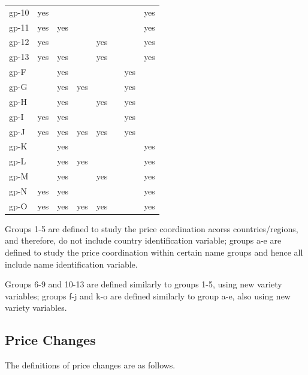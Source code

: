 \begin{table}[H]
\begin{tabular}{l|rrrrrrr}
		gp-10 &  yes &      &         &      &         &          &      yes \\
		gp-11 &  yes &  yes &         &      &         &          &      yes \\
		gp-12 &  yes &      &         &  yes &         &          &      yes \\
		gp-13 &  yes &  yes &         &  yes &         &          &      yes \\ \hline\hline
		gp-F  &      &  yes &         &      &         &      yes &          \\
		gp-G  &      &  yes &     yes &      &         &      yes &          \\
		gp-H  &      &  yes &         &  yes &         &      yes &          \\
		gp-I  &  yes &  yes &         &      &         &      yes &          \\
		gp-J  &  yes &  yes &     yes &  yes &         &      yes &          \\ \hline
		gp-K  &      &  yes &         &      &         &          &      yes \\
		gp-L  &      &  yes &     yes &      &         &          &      yes \\
		gp-M  &      &  yes &         &  yes &         &          &      yes \\
		gp-N  &  yes &  yes &         &      &         &          &      yes \\
		gp-O  &  yes &  yes &     yes &  yes &         &          &      yes \\ \hline\hline
	\end{tabular}
\end{table}

Groups 1-5 are defined to study the price coordination acorss countries/regions, and therefore, do not include country identification variable; groups a-e are defined to study the price coordination within certain name groups and hence all include name identification variable.

Groups 6-9 and 10-13 are defined similarly to groups 1-5, using new variety variables; groups f-j and k-o are defined similarly to group a-e, also using new variety variables.

\subsection{Price Changes}

The definitions of price changes are as follows.

